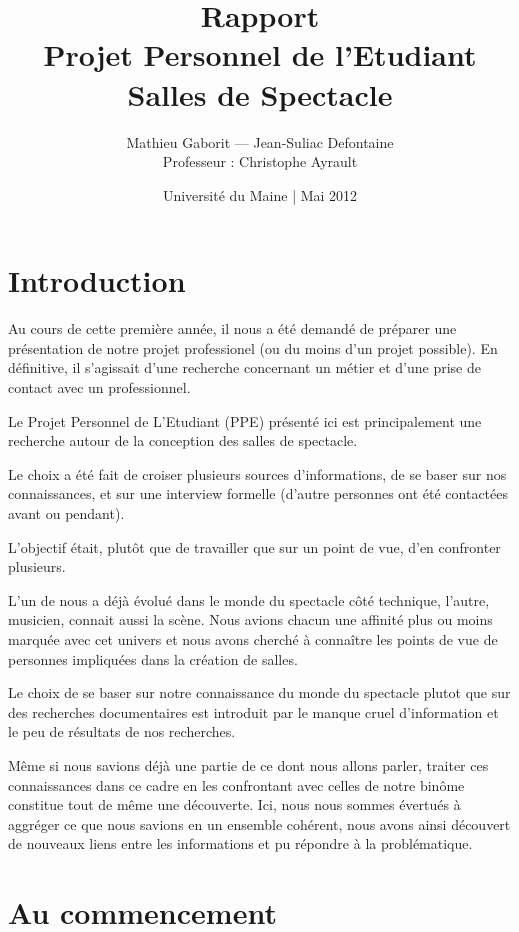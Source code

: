 \documentclass[a4paper, 11pt]{report}
\title{{\Huge Rapport}\\Projet Personnel de l'Etudiant\\
        Salles de Spectacle}
\author{Mathieu Gaborit — Jean-Suliac Defontaine\\Professeur : Christophe Ayrault}
\date{Université du Maine | Mai 2012}
\begin{document}
    \selectfont

    \maketitle
    
    \tableofcontents
    \newpage


\section*{Introduction}

Au cours de cette première année, il nous a été demandé de préparer une présentation de notre projet professionel (ou du moins d'un projet possible).
En définitive, il s'agissait d'une recherche concernant un métier et d'une prise de contact avec un professionnel.

Le Projet Personnel de L'Etudiant (PPE) présenté ici est principalement une recherche autour de la conception des salles de spectacle.

Le choix a été fait de croiser plusieurs sources d'informations, de se baser sur nos connaissances, et sur une interview formelle (d'autre personnes ont été contactées avant ou pendant).

L'objectif était, plutôt que de travailler que sur un point de vue, d'en confronter plusieurs.

L'un de nous a déjà évolué dans le monde du spectacle côté technique, l'autre, musicien, connait aussi la scène.
Nous avions chacun une affinité plus ou moins marquée avec cet univers et nous avons cherché à connaître les points de vue de personnes impliquées dans la création de salles.

Le choix de se baser sur notre connaissance du monde du spectacle plutot que sur des recherches documentaires est introduit par le manque cruel d'information et le peu de résultats de nos recherches.

Même si nous savions déjà une partie de ce dont nous allons parler, traiter ces connaissances dans ce cadre en les confrontant avec celles de notre binôme constitue tout de même une découverte.
Ici, nous nous sommes évertués à aggréger ce que nous savions en un ensemble cohérent, nous avons ainsi découvert de nouveaux liens entre les informations et pu répondre à la problématique.

\section{Au commencement}
\end{document}
